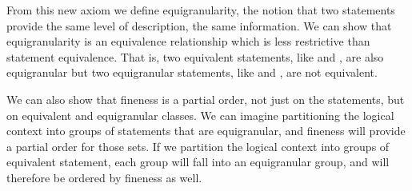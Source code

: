 \documentclass[11pt,letterpaper,fleqn]{memoir} %
\begin{document}
From this new axiom we define equigranularity, the notion that two statements provide the same level of description, the same information. We can show that equigranularity is an equivalence relationship which is less restrictive than statement equivalence. That is, two equivalent statements, like  and , are also equigranular but two equigranular statements, like  and , are not equivalent.

We can also show that fineness is a partial order, not just on the statements, but on equivalent and equigranular classes. We can imagine partitioning the logical context into groups of statements that are equigranular, and fineness will provide a partial order for those sets. If we partition the logical context into groups of equivalent statement, each group will fall into an equigranular group, and will therefore be ordered by fineness as well.
\end{document}
